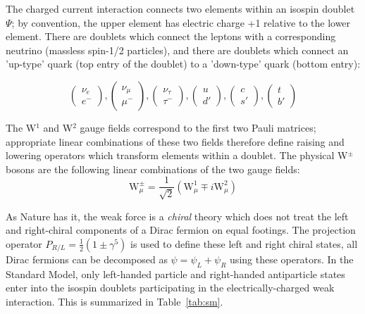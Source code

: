 The charged current interaction connects two elements within an isospin doublet $\Psi$; by convention, the upper element has electric charge +1 relative to the lower element. There are doublets which connect the leptons with a corresponding neutrino (massless spin-1/2 particles), and there are doublets which connect an 'up-type' quark (top entry of the doublet) to a 'down-type' quark (bottom entry):

\begin{equation*}
\begin{pmatrix} \nu_{e} \\ e^{-} \end{pmatrix},
\begin{pmatrix} \nu_{\mu} \\ \mu^{-} \end{pmatrix},
\begin{pmatrix} \nu_{\tau} \\ \tau^{-} \end{pmatrix},
\begin{pmatrix} u \\ d' \end{pmatrix},
\begin{pmatrix} c \\ s' \end{pmatrix},
\begin{pmatrix} t \\ b' \end{pmatrix}
\end{equation*}

The W$^{1}$ and W$^{2}$ gauge fields correspond to the first two Pauli matrices; appropriate linear combinations of these two fields therefore define raising and lowering operators which transform elements within a doublet. The physical W$^{\pm}$ bosons are the following linear combinations of the two gauge fields:
\begin{equation}
\mathrm{W}_{\mu}^{\pm} = \frac{1}{\sqrt{2}} ( \mathrm{W}^{1}_{\mu} \mp i\mathrm{W}_{\mu}^{2})
\end{equation}

As Nature has it, the weak force is a \textit{chiral} theory which does not treat the left and right-chiral components of a Dirac fermion on equal footings.  The projection operator $P_{R/L} = \frac{1}{2} ( 1 \pm \gamma^{5})$ is used to define these left and right chiral states, all Dirac fermions can be decomposed as $\psi = \psi_{L} + \psi_{R}$ using these operators. In the Standard Model, only left-handed particle and right-handed antiparticle states enter into the isospin doublets participating in the electrically-charged weak interaction. This is summarized in Table~\ref{tab:sm}.

